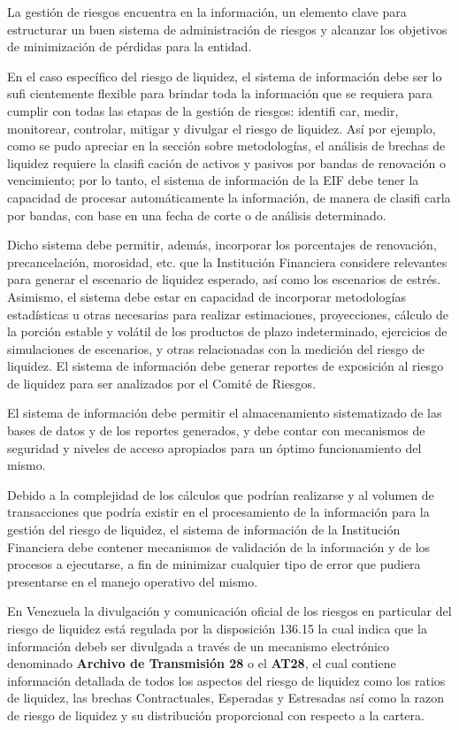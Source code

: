 \documentclass[10pt,]{article}
\begin{document}
La gestión de riesgos encuentra en la información, un elemento clave
para estructurar un buen sistema de administración de riesgos y alcanzar
los objetivos de minimización de pérdidas para la entidad.

En el caso específico del riesgo de liquidez, el sistema de información
debe ser lo sufi cientemente flexible para brindar toda la información
que se requiera para cumplir con todas las etapas de la gestión de
riesgos: identifi car, medir, monitorear, controlar, mitigar y divulgar
el riesgo de liquidez. Así por ejemplo, como se pudo apreciar en la
sección sobre metodologías, el análisis de brechas de liquidez requiere
la clasifi cación de activos y pasivos por bandas de renovación o
vencimiento; por lo tanto, el sistema de información de la EIF debe
tener la capacidad de procesar automáticamente la información, de manera
de clasifi carla por bandas, con base en una fecha de corte o de
análisis determinado.

Dicho sistema debe permitir, además, incorporar los porcentajes de
renovación, precancelación, morosidad, etc. que la Institución
Financiera considere relevantes para generar el escenario de liquidez
esperado, así como los escenarios de estrés. Asimismo, el sistema debe
estar en capacidad de incorporar metodologías estadísticas u otras
necesarias para realizar estimaciones, proyecciones, cálculo de la
porción estable y volátil de los productos de plazo indeterminado,
ejercicios de simulaciones de escenarios, y otras relacionadas con la
medición del riesgo de liquidez. El sistema de información debe generar
reportes de exposición al riesgo de liquidez para ser analizados por el
Comité de Riesgos.

El sistema de información debe permitir el almacenamiento sistematizado
de las bases de datos y de los reportes generados, y debe contar con
mecanismos de seguridad y niveles de acceso apropiados para un óptimo
funcionamiento del mismo.

Debido a la complejidad de los cálculos que podrían realizarse y al
volumen de transacciones que podría existir en el procesamiento de la
información para la gestión del riesgo de liquidez, el sistema de
información de la Institución Financiera debe contener mecanismos de
validación de la información y de los procesos a ejecutarse, a fin de
minimizar cualquier tipo de error que pudiera presentarse en el manejo
operativo del mismo.

En Venezuela la divulgación y comunicación oficial de los riesgos en
particular del riesgo de liquidez está regulada por la disposición
136.15 la cual indica que la información debeb ser divulgada a través de
un mecanismo electrónico denominado \textbf{Archivo de Transmisión 28} o
el \textbf{AT28}, el cual contiene información detallada de todos los
aspectos del riesgo de liquidez como los ratios de liquidez, las brechas
Contractuales, Esperadas y Estresadas así como la razon de riesgo de
liquidez y su distribución proporcional con respecto a la cartera.
\end{document}
